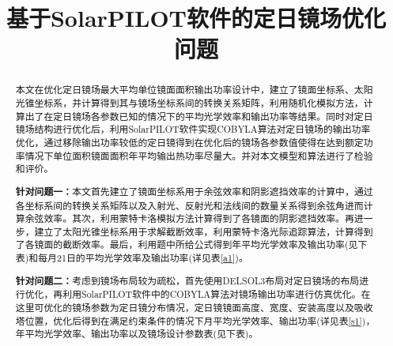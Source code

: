 \documentclass[withoutpreface,bwprint]{cumcmthesis} %
\title{基于SolarPILOT软件的定日镜场优化问题}
\begin{document}
\maketitle
 \begin{abstract}
本文在优化定日镜场最大平均单位镜面面积输出功率设计中，建立了镜面坐标系、太阳光锥坐标系，并计算得到其与镜场坐标系间的转换关系矩阵，利用随机化模拟方法，计算出了在定日镜场各参数已知的情况下的平均光学效率和输出功率等结果。同时对定日镜场结构进行优化后，利用SolarPILOT软件实现COBYLA算法对定日镜场的输出功率优化，通过移除输出功率较低的定日镜得到在优化后的镜场各参数值使得在达到额定功率情况下单位面积镜面面积年平均输出热功率尽量大。并对本文模型和算法进行了检验和评价。

\textbf{针对问题一：}本文首先建立了镜面坐标系用于余弦效率和阴影遮挡效率的计算中，通过各坐标系间的转换关系矩阵以及入射光、反射光和法线间的数量关系得到余弦角进而计算余弦效率。其次，利用蒙特卡洛模拟方法计算得到了各镜面的阴影遮挡效率。再进一步，建立了太阳光锥坐标系用于求解截断效率，利用蒙特卡洛光际追踪算法，计算得到了各镜面的截断效率。最后，利用题中所给公式得到年平均光学效率及输出功率(见下表)和每月21日的平均光学效率及输出功率(详见表\ref{a1})。
\noindent
{}

\textbf{针对问题二：}考虑到镜场布局较为疏松，首先使用DELSOL3布局对定日镜场的布局进行优化，再利用SolarPILOT软件中的COBYLA算法对镜场输出功率进行仿真优化。在这里可优化的镜场参数为定日镜分布情况，定日镜镜面高度、宽度、安装高度以及吸收塔位置，优化后得到在满足约束条件的情况下月平均光学效率、输出功率(详见表\ref{s1})，年平均光学效率、输出功率以及镜场设计参数表(见下表)。


\end{abstract}
\end{document}
